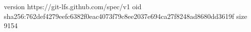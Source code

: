 version https://git-lfs.github.com/spec/v1
oid sha256:762def4279eefc6382f0eac4073f79c8ee2037e694ca27f8248ad8680dd3619f
size 9154
